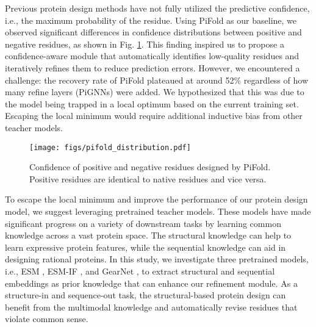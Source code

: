 \documentclass{article}
\begin{document}
\begin{minipage}{\linewidth}
    \begin{minipage}{0.65\linewidth}
        Previous protein design methods have not fully utilized the predictive confidence, i.e., the maximum probability of the residue. Using PiFold \citep{gao2023pifold} as our baseline, we observed significant differences in confidence distributions between positive and negative residues, as shown in Fig. \ref{fig:pifold_distribution}. This finding inspired us to propose a confidence-aware module that automatically identifies low-quality residues and iteratively refines them to reduce prediction errors. However, we encountered a challenge: the recovery rate of PiFold plateaued at around 52\% regardless of how many refine layers (PiGNNs) were added. We hypothesized that this was due to the model being trapped in a local optimum based on the current training set. Escaping the local minimum would require additional inductive bias from other teacher models.
    \end{minipage}
    \hspace{0.00\linewidth}
    \begin{minipage}{0.35\linewidth}
        \begin{figure}[H]
            \centering
            \texttt{[image: figs/pifold\_distribution.pdf]}
            \captionsetup{font=small}
            \caption{Confidence of positive and negative residues designed by PiFold\citep{gao2023pifold}. Positive residues are identical to native residues and vice versa.}
            \label{fig:pifold_distribution}
            \vspace{-3mm}
         \end{figure}
    \end{minipage}
\end{minipage}

To escape the local minimum and improve the performance of our protein design model, we suggest leveraging pretrained teacher models. These models have made significant progress on a variety of downstream tasks \citep{zhang2022protein,meier2021language, zhang2022ontoprotein,chen2023data} by learning common knowledge across a vast protein space. The structural knowledge \citep{zhang2022protein, hsu2022learning} can help to learn expressive protein features, while the sequential knowledge \citep{meier2021language} can aid in designing rational proteins. In this study, we investigate three pretrained models, i.e., ESM \citep{meier2021language,lin2022language}, ESM-IF \citep{hsu2022learning}, and GearNet \citep{zhang2022protein}, to extract structural and sequential embeddings as prior knowledge that can enhance our refinement module. As a structure-in and sequence-out task, the structural-based protein design can benefit from the multimodal knowledge and automatically revise residues that violate common sense.
\end{document}
